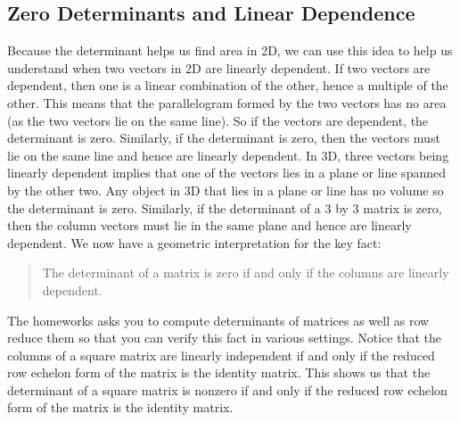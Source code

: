{\subsection{Zero Determinants and Linear Dependence}
Because the determinant helps us find area in 2D, we can use this idea to help us understand when two vectors in 2D are linearly dependent.  
If two vectors are dependent, then one is a linear combination of the other, hence a multiple of the other.  
This means that the parallelogram formed by the two vectors has no area (as the two vectors lie on the same line).  
So if the vectors are dependent, the determinant is zero.  
Similarly, if the determinant is zero, then the vectors must lie on the same line and hence are linearly dependent.  
In 3D, three vectors being linearly dependent implies that one of the vectors lies in a plane or line spanned by the other two.
Any object in 3D that lies in a plane or line has no volume so the determinant is zero.  
Similarly, if the determinant of a 3 by 3 matrix is zero, then the column vectors must lie in the same plane and hence are linearly dependent. 
We now have a geometric interpretation for the key fact:
\begin{quote}The determinant of a matrix is zero if and only if the columns are linearly dependent.\end{quote}
The homeworks asks you to compute determinants of matrices as well as row reduce them so that you can verify this fact in various settings. 
Notice that the columns of a square matrix are linearly independent if and only if the reduced row echelon form of the matrix is the identity matrix. 
This shows us that the determinant of a square matrix is nonzero if and only if the reduced row echelon form of the matrix is the identity matrix. 




}
